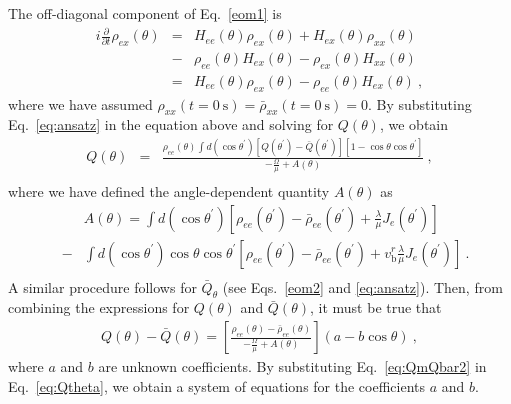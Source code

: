 \documentclass[aps, prd, 10pt, twocolumn, superscriptaddress, noshowpacs, preprintnumbers, longbibliography, groupedaddress, footinbib, bibnotes]{revtex4-1}
\newcommand{\vbr}{v_{\mathrm{b}}^{r}}
\begin{document}
The off-diagonal component of Eq.~\ref{eom1} is 
\begin{eqnarray}\label{eom_lin}
 i \frac{\partial}{\partial t}\rho_{ex}(\theta) &=& H_{ee}(\theta)\rho_{ex}(\theta) + H_{ex}(\theta)\rho_{xx}(\theta) \nonumber \\
 &-& \rho_{ee}(\theta)H_{ex}(\theta) - \rho_{ex}(\theta)H_{xx}(\theta) \nonumber \\ 
 &=& H_{ee}(\theta)\rho_{ex}(\theta) - \rho_{ee}(\theta)H_{ex}(\theta)\ ,
\end{eqnarray}
where we have assumed $\rho_{xx} (t=0~\mathrm{s}) = \bar\rho_{xx}(t=0~\mathrm{s}) = 0$. By substituting Eq.~\ref{eq:ansatz} in the equation above and solving for $Q(\theta)$, we obtain 
\begin{eqnarray}\label{eq:Qtheta}
 Q(\theta) &=& \frac{ \rho_{ee}(\theta) \int d (\cos{\theta^\prime}) [ Q(\theta^{\prime})-\bar{Q}(\theta^{\prime}) ] \left[1 - \cos{\theta}\cos{\theta^{\prime}} \right] } { -\frac{\Omega}{\mu} + A(\theta) }\ , \nonumber \\
 & &
\end{eqnarray}
where we have defined the angle-dependent quantity $A(\theta)$ as
\begin{eqnarray}
	& &A(\theta) =  \int d (\cos{\theta^\prime}) [ \rho_{ee}(\theta^{\prime})-\bar{\rho}_{ee}(\theta^{\prime}) + \frac{\lambda}{\mu} J_e(\theta^{\prime})] \nonumber \\
	&-& \int d (\cos{\theta^\prime}) \cos{\theta}\cos{\theta^{\prime}} [ \rho_{ee}(\theta^{\prime})-\bar{\rho}_{ee}(\theta^{\prime}) + \vbr \frac{\lambda}{\mu} J_e(\theta^{\prime})]\ .  \nonumber \\
	& & \nonumber 
\end{eqnarray}
A similar procedure follows for $\bar{Q}_{\theta}$ (see Eqs.~\ref{eom2} and \ref{eq:ansatz}). Then, from combining the expressions for $Q(\theta)$ and $\bar{Q}(\theta)$, it must be true that 
\begin{eqnarray}\label{eq:QmQbar2}
 Q(\theta)-\bar{Q}(\theta) = \left[\frac{\rho_{ee}(\theta)-\bar{\rho}_{ee}(\theta)}{-\frac{\Omega}{\mu} + A(\theta)}\right] (a - b\cos{\theta})\ ,
\end{eqnarray}
where $a$ and $b$ are unknown coefficients. By substituting Eq.~\ref{eq:QmQbar2} in Eq.~\ref{eq:Qtheta}, we obtain a system of equations for the coefficients $a$ and $b$. 
\end{document}
